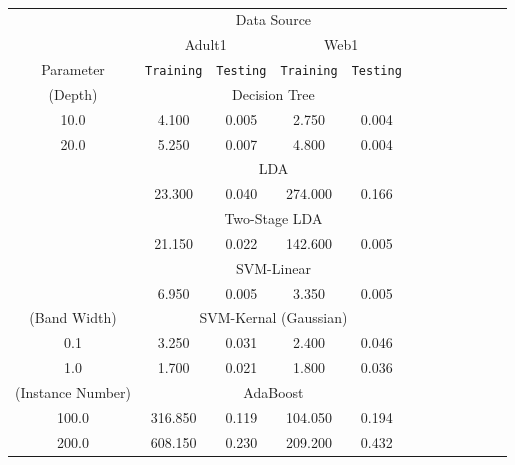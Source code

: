 \documentclass{article}
\theoremstyle{plain}
\begin{document}
\begin{table*}
\vspace{-0.14in}
\caption{\vspace{-5mm}}
		\label{tab:table11}
\begin{center}
\tiny{
\begin{tabular}{*{12}{c}}
\toprule
     & \multicolumn{4}{c}{Data Source}\\
    \cmidrule(lr){2-5}
     &
    \multicolumn{2}{c}{Adult1} &
    \multicolumn{2}{c}{Web1} &\\
\cmidrule(lr){2-3}
\cmidrule(lr){4-5}




Parameter &\texttt{Training} & \texttt{Testing} &
           \texttt{Training} & \texttt{Testing} &\\


\cmidrule(lr){1-1}
\cmidrule(lr){1-5}
(Depth)& \multicolumn{4}{c}{Decision Tree}\\
\cmidrule(lr){1-5}
10.0&4.100&0.005&2.750&0.004\\
20.0&5.250&0.007&4.800&0.004\\

\cmidrule(lr){1-1}
\cmidrule(lr){1-5}
& \multicolumn{4}{c}{LDA}\\
\cmidrule(lr){1-5}
&23.300&0.040&274.000&0.166 \\

\cmidrule(lr){1-1}
\cmidrule(lr){1-5}
& \multicolumn{4}{c}{Two-Stage LDA}\\
\cmidrule(lr){1-5}
&21.150&0.022&142.600&0.005 \\

\cmidrule(lr){1-1}
\cmidrule(lr){1-5}
& \multicolumn{4}{c}{SVM-Linear}\\
\cmidrule(lr){1-5}
&6.950&0.005&3.350&0.005 \\

\cmidrule(lr){1-1}
\cmidrule(lr){1-5}
(Band Width)& \multicolumn{4}{c}{SVM-Kernal (Gaussian)}\\
\cmidrule(lr){1-5}
0.1&3.250&0.031&2.400&0.046\\
1.0&1.700&0.021&1.800&0.036\\

\cmidrule(lr){1-1}
\cmidrule(lr){1-5}
(Instance Number)& \multicolumn{4}{c}{AdaBoost}\\
\cmidrule(lr){1-5}
100.0&316.850&0.119&104.050&0.194\\
200.0&608.150&0.230&209.200&0.432\\

\bottomrule

\end{tabular}
}
\end{center}
\label{tab:main-result}
\vspace{-5mm}
\end{table*}
\end{document}
